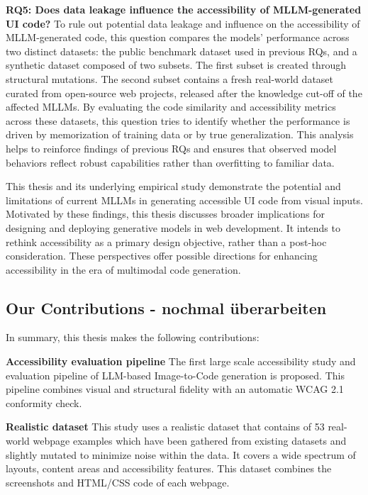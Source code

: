 \textbf{RQ5: Does data leakage influence the accessibility of MLLM-generated UI code?}
To rule out potential data leakage and influence on the accessibility 
of MLLM-generated code, this question compares the models' performance across
two distinct datasets: the public benchmark dataset used in previous 
RQs, and a synthetic dataset composed of two subsets. The first 
subset is created through structural mutations. The second subset contains
a fresh real-world dataset curated from open-source web projects, 
released after the knowledge cut-off of the affected MLLMs. By 
evaluating the code similarity and accessibility metrics across
these datasets, this question tries to identify whether the
performance is driven by memorization of training data or by
true generalization. This analysis helps to reinforce findings
of previous RQs and ensures that observed model behaviors reflect
robust capabilities rather than overfitting to familiar data.\newline

This thesis and its underlying empirical study demonstrate the potential and 
limitations of current MLLMs in generating accessible UI code 
from visual inputs. 
Motivated by these findings, this thesis discusses broader implications
for designing and deploying generative models in web development. It 
intends to rethink accessibility as a primary design objective, rather than a 
post-hoc consideration. These perspectives offer possible directions for 
enhancing accessibility in the era of multimodal code generation.



\subsection{Our Contributions - nochmal überarbeiten}
In summary, this thesis makes the following contributions:\newline

\textbf{Accessibility evaluation pipeline}
The first large scale accessibility study and evaluation pipeline of LLM-based
Image-to-Code generation is proposed. This pipeline combines visual and structural 
fidelity with an automatic WCAG 2.1 conformity check.\newline

\textbf{Realistic dataset}
This study uses a realistic dataset that contains of 53 real-world webpage 
examples which have been gathered from existing datasets and slightly mutated to
minimize noise within the data. It covers a wide spectrum of layouts, content 
areas and accessibility features. This dataset combines the screenshots 
and HTML/CSS code of each webpage.\newline

